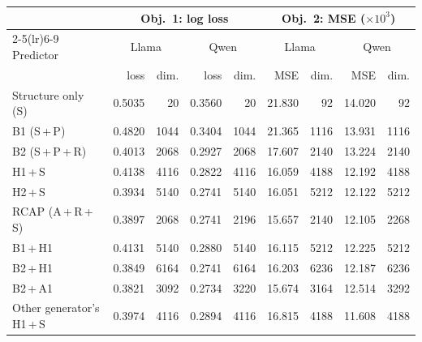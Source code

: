 \begin{tabular}{lrrrrrrrr}
\toprule
 & \multicolumn{4}{c}{Obj.~1: log loss} & \multicolumn{4}{c}{Obj.~2: MSE ($\times 10^{3}$)} \\
\cmidrule(lr){2-5}\cmidrule(lr){6-9}
Predictor & \multicolumn{2}{c}{Llama} & \multicolumn{2}{c}{Qwen} & \multicolumn{2}{c}{Llama} & \multicolumn{2}{c}{Qwen} \\
 & loss & dim. & loss & dim. & MSE & dim. & MSE & dim. \\
\midrule
Structure only (S) & 0.5035 & 20 & 0.3560 & 20 & 21.830 & 92 & 14.020 & 92 \\
\midrule
B1 (S\,+\,P) & 0.4820 & 1044 & 0.3404 & 1044 & 21.365 & 1116 & 13.931 & 1116 \\
B2 (S\,+\,P\,+\,R) & 0.4013 & 2068 & 0.2927 & 2068 & 17.607 & 2140 & 13.224 & 2140 \\
H1\,+\,S & 0.4138 & 4116 & 0.2822 & 4116 & 16.059 & 4188 & 12.192 & 4188 \\
H2\,+\,S & 0.3934 & 5140 & 0.2741 & 5140 & 16.051 & 5212 & 12.122 & 5212 \\
RCAP (A\,+\,R\,+\,S) & 0.3897 & 2068 & 0.2741 & 2196 & 15.657 & 2140 & 12.105 & 2268 \\
\midrule
B1\,+\,H1 & 0.4131 & 5140 & 0.2880 & 5140 & 16.115 & 5212 & 12.225 & 5212 \\
B2\,+\,H1 & 0.3849 & 6164 & 0.2741 & 6164 & 16.203 & 6236 & 12.187 & 6236 \\
B2\,+\,A1 & 0.3821 & 3092 & 0.2734 & 3220 & 15.674 & 3164 & 12.514 & 3292 \\
Other generator's H1\,+\,S & 0.3974 & 4116 & 0.2894 & 4116 & 16.815 & 4188 & 11.608 & 4188 \\
\bottomrule
\end{tabular}
